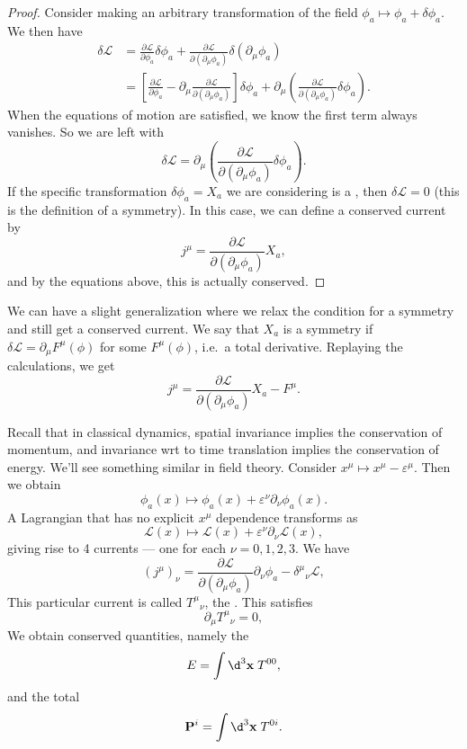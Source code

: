 \documentclass[a4paper]{article}
\begin{document}
\begin{proof}
  Consider making an arbitrary transformation of the field $\phi_a \mapsto \phi_a + \delta \phi_a$. We then have
  \begin{align*}
    \delta \mathcal{L} &= \frac{\partial \mathcal{L}}{\partial \phi_a} \delta \phi_a + \frac{\partial \mathcal{L}}{\partial(\partial_\mu \phi_a)} \delta(\partial_\mu \phi_a)\\
    &= \left[\frac{\partial \mathcal{L}}{\partial \phi_a} - \partial_\mu \frac{\partial \mathcal{L}}{\partial(\partial_\mu \phi_a)}\right] \delta \phi_a + \partial_\mu \left(\frac{\partial \mathcal{L}}{\partial(\partial_\mu \phi_a)} \delta \phi_a\right).
  \end{align*}
  When the equations of motion are satisfied, we know the first term always vanishes. So we are left with
  \[
    \delta \mathcal{L} = \partial_\mu \left(\frac{\partial \mathcal{L}}{\partial(\partial_\mu \phi_a)} \delta \phi_a\right).
  \]
  If the specific transformation $\delta \phi_a = X_a$ we are considering is a , then $\delta\mathcal{L} = 0$ (this is the definition of a symmetry). In this case, we can define a conserved current by
  \[
    j^\mu = \frac{\partial \mathcal{L}}{\partial (\partial_\mu \phi_a)}X_a,
  \]
  and by the equations above, this is actually conserved.
\end{proof}
We can have a slight generalization where we relax the condition for a symmetry and still get a conserved current. We say that $X_a$ is a symmetry if $\delta \mathcal{L} = \partial_\mu F^\mu(\phi)$ for some $F^\mu(\phi)$, i.e.\ a total derivative. Replaying the calculations, we get
\[
  j^\mu = \frac{\partial \mathcal{L}}{\partial (\partial_\mu \phi_a)} X_a - F^\mu.
\]
\begin{eg}
  Recall that in classical dynamics, spatial invariance implies the conservation of momentum, and invariance wrt to time translation implies the conservation of energy. We'll see something similar in field theory. Consider $x^\mu \mapsto x^\mu - \varepsilon^\mu$. Then we obtain
  \[
    \phi_a(x) \mapsto \phi_a(x) + \varepsilon^\nu \partial_\nu \phi_a(x).
  \]
  A Lagrangian that has no explicit $x^\mu$ dependence transforms as
  \[
    \mathcal{L}(x) \mapsto \mathcal{L}(x) + \varepsilon^\nu \partial_\nu \mathcal{L}(x),
  \]
  giving rise to 4 currents --- one for each $\nu = 0, 1, 2, 3$. We have
  \[
    (j^\mu)_\nu = \frac{\partial \mathcal{L}}{\partial (\partial_\mu \phi_a)} \partial_\nu \phi_a - \delta^\mu\!_\nu \mathcal{L},
  \]
  This particular current is called $T^\mu\!_\nu$, the . This satisfies
  \[
    \partial_\mu T^\mu\!_\nu = 0,
  \]
  We obtain conserved quantities, namely the 
  \[
    E = \int \d^3 \mathbf{x}\;T^{00},
  \]
  and the total 
  \[
    \mathbf{P}^i = \int \d^3 \mathbf{x}\; T^{0i}.
  \]
\end{eg}
\end{document}
